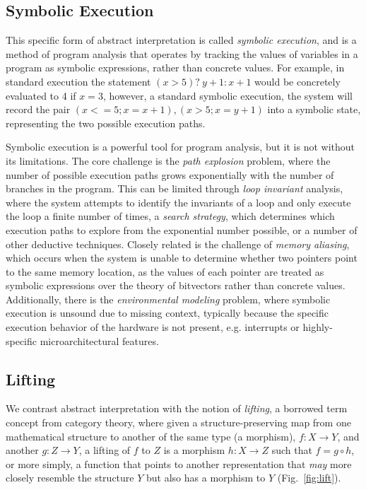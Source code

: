 \subsection{Symbolic Execution}

This specific form of abstract interpretation is called \emph{symbolic execution}, and is a method of program analysis that operates by tracking the values of variables in a program as symbolic expressions, rather than concrete values.
For example, in standard execution the statement $(x > 5) ?\ y + 1 : x + 1$ would be concretely evaluated to 4 if $x = 3$, however, a standard symbolic execution, the system will record the pair $(x<=5; x=x+1),(x>5;x=y+1)$ into a symbolic state, representing the two possible execution paths.

Symbolic execution is a powerful tool for program analysis, but it is not without its limitations.
The core challenge is the \emph{path explosion} problem, where the number of possible execution paths grows exponentially with the number of branches in the program.
This can be limited through \emph{loop invariant} analysis, where the system attempts to identify the invariants of a loop and only execute the loop a finite number of times, a \emph{search strategy}, which determines which execution paths to explore from the exponential number possible, or a number of other deductive techniques.
Closely related is the challenge of \emph{memory aliasing}, which occurs when the system is unable to determine whether two pointers point to the same memory location, as the values of each pointer are treated as symbolic expressions over the theory of bitvectors rather than concrete values.
Additionally, there is the \emph{environmental modeling} problem, where symbolic execution is unsound due to missing context, typically because the specific execution behavior of the hardware is not present, e.g. interrupts or highly-specific microarchitectural features.

\subsection{Lifting}

We contrast abstract interpretation with the notion of \emph{lifting}, a borrowed term concept from category theory, where given a structure-preserving map from one mathematical structure to another of the same type (a morphism), $f: X \rightarrow Y$,  and another $g: Z \rightarrow Y$, a lifting of $f$ to $Z$ is a morphism $h: X \rightarrow Z$ such that $f = g \circ h$, or more simply, a function that points to another representation that \emph{may} more closely resemble the structure $Y$ but also has a morphism to $Y$ (Fig.~\ref{fig:lift}).

